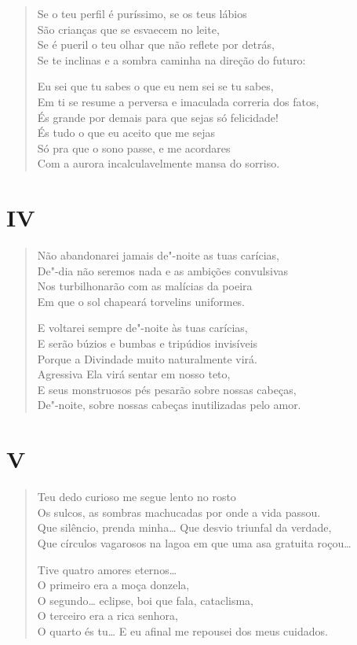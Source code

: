 \begin{verse}
Se o teu perfil é puríssimo, se os teus lábios\\
São crianças que se esvaecem no leite,\\
Se é pueril o teu olhar que não reflete por detrás,\\
Se te inclinas e a sombra caminha na direção do futuro:

Eu sei que tu sabes o que eu nem sei se tu sabes,\\
Em ti se resume a perversa e imaculada correria dos fatos,\\
És grande por demais para que sejas só felicidade!\\
És tudo o que eu aceito que me sejas\\
Só pra que o sono passe, e me acordares\\
Com a aurora incalculavelmente mansa do sorriso.
\end{verse}

\medskip
\section*{IV}

\begin{verse}
Não abandonarei jamais de"-noite as tuas carícias,\\
De"-dia não seremos nada e as ambições convulsivas\\
Nos turbilhonarão com as malícias da poeira\\
Em que o sol chapeará torvelins uniformes.

E voltarei sempre de"-noite às tuas carícias,\\
E serão búzios e bumbas e tripúdios invisíveis\\
Porque a Divindade muito naturalmente virá.\\
Agressiva Ela virá sentar em nosso teto,\\
E seus monstruosos pés pesarão sobre nossas cabeças,\\
De"-noite, sobre nossas cabeças inutilizadas pelo amor.
\end{verse}

\medskip
\section*{V}

\begin{verse}
Teu dedo curioso me segue lento no rosto\\
Os sulcos, as sombras machucadas por onde a vida passou.\\
Que silêncio, prenda minha\ldots{} Que desvio triunfal da verdade,\\
Que círculos vagarosos na lagoa em que uma asa gratuita roçou\ldots{}

Tive quatro amores eternos\ldots{}\\
O primeiro era a moça donzela,\\
O segundo\ldots{} eclipse, boi que fala, cataclisma,\\
O terceiro era a rica senhora,\\
O quarto és tu\ldots{} E eu afinal me repousei dos meus cuidados.
\end{verse}

